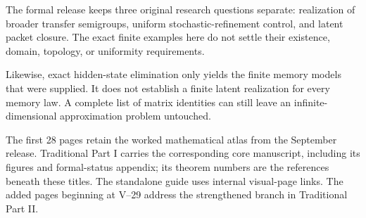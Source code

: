 The formal release keeps three original research questions separate: realization of broader transfer semigroups, uniform stochastic-refinement control, and latent packet closure. The exact finite examples here do not settle their existence, domain, topology, or uniformity requirements.

Likewise, exact hidden-state elimination only yields the finite memory models that were supplied. It does not establish a finite latent realization for every memory law. A complete list of matrix identities can still leave an infinite-dimensional approximation problem untouched.

The first 28 pages retain the worked mathematical atlas from the September release. Traditional Part I carries the corresponding core manuscript, including its figures and formal-status appendix; its theorem numbers are the references beneath these titles. The standalone guide uses internal visual-page links. The added pages beginning at V--29 address the strengthened branch in Traditional Part II.

